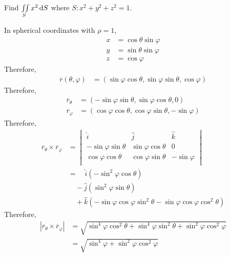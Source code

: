 \documentclass[fleqn, a4paper, 12pt, twoside]{article}
\theoremstyle{definition}
\theoremstyle{theorem}
\begin{document}
{\begin{question}
	Find $\iint\limits_{S} x^2 \dif S$ where $S : x^2 + y^2 + z^2 = 1$.
\end{question}

\begin{solution}
	In spherical coordinates with $\rho = 1$,
	\begin{align*}
		x &= \cos \theta \sin \varphi\\
		y &= \sin \theta \sin \varphi\\
		z &= \cos \varphi
	\end{align*}
	Therefore,
	\begin{align*}
		\overline{r}(\theta , \varphi) & = (\sin \varphi \cos \theta , \sin \varphi \sin \theta , \cos \varphi)
	\end{align*}
	Therefore,
	\begin{align*}
		\overline{r}_{\theta}  & = (-\sin \varphi \sin \theta , \sin \varphi \cos \theta , 0) \\
		\overline{r}_{\varphi} & = (\cos \varphi \cos \theta , \cos \varphi \sin \theta , -\sin \varphi)
	\end{align*}
	Therefore,
	\begin{align*}
		\overline{r}_{\theta} \times \overline{r}_{\varphi} &=
			\begin{vmatrix}
				\hat{i}                   & \hat{j}                  & \hat{k}       \\
				-\sin \varphi \sin \theta & \sin \varphi \cos \theta & 0             \\
				\cos \varphi \cos \theta  & \cos \varphi \sin \theta & -\sin \varphi \\
			\end{vmatrix}\\
		&= \quad \hat{i} \left( -\sin^2 \varphi \cos \theta \right)\\
		&\quad - \hat{j} \left( \sin^2 \varphi \sin \theta \right)\\
		&\quad + \hat{k} \left( -\sin \varphi \cos \varphi \sin^2 \theta - \sin \varphi \cos \varphi \cos^2 \theta \right)
	\end{align*}
	Therefore,
	\begin{align*}
		\left| \overline{r}_{\theta} \times \overline{r}_{\varphi} \right| & = \sqrt{\sin^4 \varphi \cos^2 \theta + \sin^4 \varphi \sin^2 \theta + \sin^2 \varphi \cos^2 \varphi} \\
                                                                                   & = \sqrt{\sin^4 \varphi + \sin^2 \varphi \cos^2 \varphi}                                              \\

\end{align*}
\end{solution}}
\end{document}
